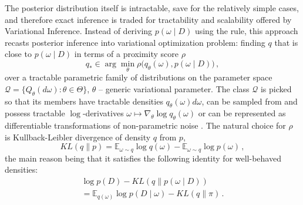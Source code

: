 \documentclass[a4paper,10pt]{article}
\begin{document}
The posterior distribution itself is intractable, save for the relatively simple cases, and
therefore exact inference is traded for tractability and scalability offered by Variational
Inference. Instead of deriving $p(\omega \mid D)$ using the rule, this approach recasts
posterior inference into variational optimization problem: finding $q$ that is close to
$p(\omega \mid D)$ in terms of a proximity score $\rho$
\begin{equation}  \label{eq:variational-progam}
  q_*
    \in \arg \min_{\theta} \rho\bigl(
      q_\theta(\omega), p(\omega \mid D)
    \bigr)
    \,,
\end{equation}
over a tractable parametric family of distributions on the parameter space $
  \mathcal{Q} = \{Q_\theta(d\omega) \colon \theta \in \Theta\}
$, $\theta$ -- generic variational parameter. The class $\mathcal{Q}$ is picked so that
its members have tractable densities $
  q_\theta(\omega) d\omega
$, can be sampled from and possess tractable $\log$-derivatives $
  \omega \mapsto \nabla_\theta \log q_\theta(\omega)
$ \citep{williams_simple_1992} or can be represented as differentiable transformations
of non-parametric noise \citep{kingma_auto-encoding_2014,figurnov_implicit_2019}.
%
The natural choice for $\rho$ is Kullback-Leibler divergence of density $q$ from $p$,
\begin{equation}  \label{eq:kl-div-def}
  KL(q \| p)
    = \mathbb{E}_{\omega \sim q}
      \log{q(\omega)}
    - \mathbb{E}_{\omega \sim q}
      \log{p(\omega)}
    \,,
\end{equation}
the main reason being that it satisfies the following identity for well-behaved densities:
\begin{multline}  \label{eq:kl-div-master}
  \log p(D)
    - KL(q \| p(\omega \mid D))
    \\ = \mathbb{E}_{q(\omega)} \log{p(D \mid \omega)}
    - KL(q \| \pi)
    \,.
\end{multline}
\end{document}
